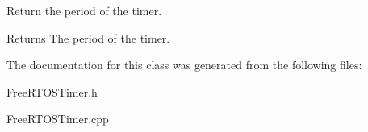 Return the period of the timer. 

\begin{DoxyReturn}{Returns}
The period of the timer. 
\end{DoxyReturn}


The documentation for this class was generated from the following files\+:\begin{DoxyCompactItemize}
\item 
Free\+R\+T\+O\+S\+Timer.\+h\item 
Free\+R\+T\+O\+S\+Timer.\+cpp\end{DoxyCompactItemize}

